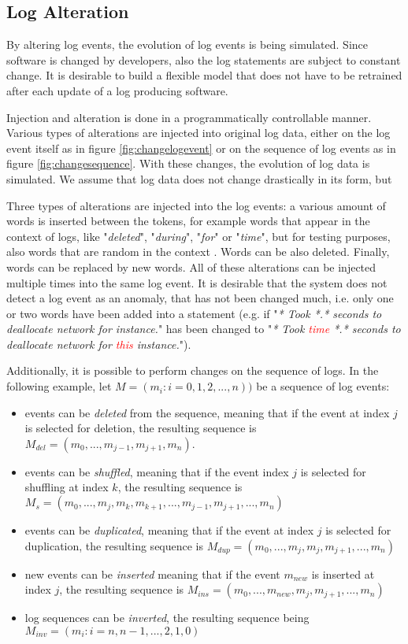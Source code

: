 \subsection{Log Alteration\label{sec:logs_alteration}}
By altering log events, the evolution of log events is being simulated. Since software is changed by developers, also the log statements are subject to constant change. It is desirable to build a flexible model that does not have to be retrained after each update of a log producing software.

Injection and alteration is done in a programmatically controllable manner. Various types of alterations are injected into original log data, either on the log event itself as in figure \ref{fig:changelogevent} or on the sequence of log events as in figure \ref{fig:changesequence}. With these changes, the evolution of log data is simulated. We assume that log data does not change drastically in its form, but 

Three types of alterations are injected into the log events: a various amount of words is inserted between the tokens, for example words that appear in the context of logs, like "\textit{deleted}", "\textit{during}", "\textit{for}" or "\textit{time}", but for testing purposes, also words that are random in the context . Words can be also deleted. Finally, words can be replaced by new words. All of these alterations can be injected multiple times into the same log event. It is desirable that the system does not detect a log event as an anomaly, that has not been changed much, i.e. only one or two words have been added into a statement (e.g. if "\textit{* Took *.* seconds to deallocate network for instance.}" has been changed to "\textit{* Took \textcolor{red}{time} *.* seconds to deallocate network for \textcolor{red}{this} instance.}").

Additionally, it is possible to perform changes on the sequence of logs. In the following example, let $M = (m_i : i = 0, 1, 2, ..., n))$ be a sequence of log events:
\begin{itemize}
	\setlength\itemsep{-0.5em}
	\item events can be \textit{deleted} from the sequence, meaning that if the event at index $j$ is selected for deletion, the resulting sequence is $M_{del} = (m_0, ..., m_{j-1}, m_{j+1}, m_n)$.
	\item events can be \textit{shuffled}, meaning that if the event index $j$ is selected for shuffling at index $k$, the resulting sequence is $M_s = (m_0, ..., m_j, m_k, m_{k+1}, ..., m_{j-1}, m_{j+1}, ..., m_n)$
	\item events can be \textit{duplicated}, meaning that if the event at index $j$ is selected for duplication, the resulting sequence is $M_{dup} = (m_0, ..., m_j, m_j, m_{j+1}, ..., m_n)$
	\item new events can be \textit{inserted} meaning that if the event $m_{new}$ is inserted at index $j$, the resulting sequence is $M_{ins} = (m_0, ..., m_{new}, m_j, m_{j+1}, ..., m_n)$
	\item log sequences can be \textit{inverted}, the resulting sequence being $M_{inv} = (m_i : i = n, n-1, ..., 2, 1, 0)$
\end{itemize}

